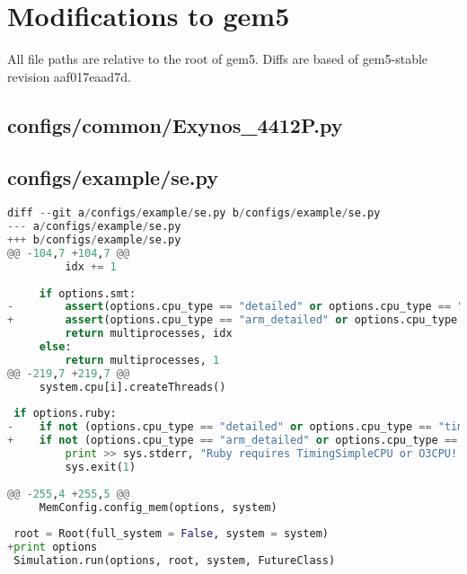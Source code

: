 \chapter{Modifications to gem5}
\label{apx:gem5files}
All file paths are relative to the root of gem5. Diffs are based of gem5-stable revision aaf017eaad7d.

\section{configs/common/Exynos\_4412P.py}
\label{gem5exynos4412p}


\section{configs/example/se.py}
\begin{lstlisting}[language=python]
diff --git a/configs/example/se.py b/configs/example/se.py
--- a/configs/example/se.py
+++ b/configs/example/se.py
@@ -104,7 +104,7 @@
         idx += 1
 
     if options.smt:
-        assert(options.cpu_type == "detailed" or options.cpu_type == "inorder")
+        assert(options.cpu_type == "arm_detailed" or options.cpu_type == "inorder")
         return multiprocesses, idx
     else:
         return multiprocesses, 1
@@ -219,7 +219,7 @@
     system.cpu[i].createThreads()
 
 if options.ruby:
-    if not (options.cpu_type == "detailed" or options.cpu_type == "timing"):
+    if not (options.cpu_type == "arm_detailed" or options.cpu_type == "timing"):
         print >> sys.stderr, "Ruby requires TimingSimpleCPU or O3CPU!!"
         sys.exit(1)
 
@@ -255,4 +255,5 @@
     MemConfig.config_mem(options, system)
 
 root = Root(full_system = False, system = system)
+print options
 Simulation.run(options, root, system, FutureClass)
\end{lstlisting}
\vfill

